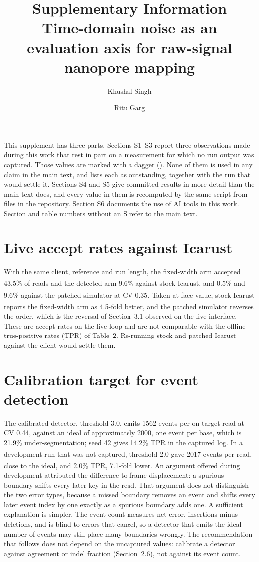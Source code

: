 \documentclass[11pt,a4paper]{article}
\title{\textbf{Supplementary Information}\\[6pt]
  \large Time-domain noise as an evaluation axis for raw-signal nanopore mapping}
\author[1,*]{Khushal Singh}
\author[1]{Ritu Garg}
\affil[1]{Department of Computer Engineering, National Institute of Technology Kurukshetra,
  Kurukshetra, Haryana 136119, India}
\affil[*]{To whom correspondence should be addressed: \texttt{khushal6002@gmail.com}}
\date{}
\newcommand{\prov}{\textsuperscript{\dag}}
\begin{document}
\maketitle

\noindent This supplement has three parts. Sections S1--S3 report three observations made during
this work that rest in part on a measurement for which no run output was captured. Those values are
marked with a dagger (\dag). None of them is used in any claim in the main text, and
 lists each as outstanding, together with the run that
would settle it. Sections S4 and S5 give committed results in more detail than the main text does,
and every value in them is recomputed by the same script from files in the repository. Section S6
documents the use of AI tools in this work. Section and table numbers without an S refer to the
main text.

\section{Live accept rates against Icarust}\label{sec:s-icarust}

With the same client, reference and run length, the fixed-width arm accepted 43.5\%\prov{} of reads
and the detected arm 9.6\%\prov{} against stock Icarust, and 0.5\%\prov{} and 9.6\%\prov{} against
the patched simulator at CV 0.35. Taken at face value, stock Icarust reports the fixed-width arm as
4.5-fold\prov{} better, and the patched simulator reverses the order, which is the reversal of
Section~3.1 observed on the live interface. These are accept rates on the live loop and are not
comparable with the offline true-positive rates (TPR) of Table~2. Re-running stock and patched
Icarust against the client would settle them.

\section{Calibration target for event detection}\label{sec:s-calibration}

The calibrated detector, threshold 3.0, emits 1562 events per on-target read at CV 0.44, against an
ideal of approximately 2000, one event per base, which is 21.9\% under-segmentation; seed 42 gives
14.2\% TPR in the captured log. In a development run that was not captured, threshold 2.0 gave
2017\prov{} events per read, close to the ideal, and 2.0\%\prov{} TPR, 7.1-fold\prov{} lower. An
argument offered during development attributed the difference to frame displacement: a spurious
boundary shifts every later key in the read. That argument does not distinguish the two error
types, because a missed boundary removes an event and shifts every later event index by one exactly
as a spurious boundary adds one. A sufficient explanation is simpler. The event count measures net
error, insertions minus deletions, and is blind to errors that cancel, so a detector that emits the
ideal number of events may still place many boundaries wrongly. The recommendation that follows
does not depend on the uncaptured values: calibrate a detector against agreement or indel fraction
(Section~2.6), not against its event count.
\end{document}
